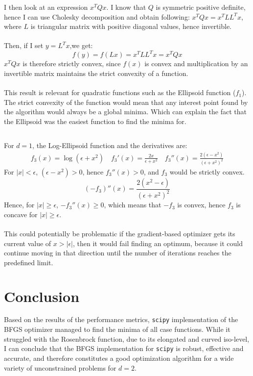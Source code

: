 \documentclass[a4paper]{article}
\begin{document}
I then look at an expression $x^TQx$. I know that $Q$ is symmetric
positive definite, hence I can use Cholesky decomposition and obtain following:
$x^TQx = x^TLL^Tx$, where $L$ is triangular matrix with positive diagonal
values, hence invertible.\\\\
Then, if I set $y=L^Tx$,we get:
\[
f(y) = f(Lx) = x^TLL^Tx = x^TQx
\]
$x^TQx$ is therefore strictly convex, since $f(x)$ is convex and 
multiplication by an invertible matrix maintains the strict convexity of a function. \\\\
This result is relevant for quadratic functions such as the Ellipsoid
function ($f_1$). The strict convexity of the function would mean that any
interest point found by the algorithm would always be a global minima. Which can
explain the fact that the Ellipsoid was the easiest function to find the minima for.


\subsection{}
For $d=1$, the Log-Ellipsoid function and the derivatives are:
\begin{align*}
  f_3(x) = \log(\epsilon + x^2) \quad
  f_3'(x) = \frac{2x}{\epsilon + x^2} \quad
  f_3''(x) = \frac{2(\epsilon - x^2)}{(\epsilon + x^2)^2}
\end{align*}
For $|x| < \epsilon$, $(\epsilon - x^2) > 0$, hence $f_3''(x) > 0$, and $f_3$
would be strictly convex.
\[
(-f_3)''(x) = \frac{2(x^2 - \epsilon)}{(\epsilon + x^2)^2}
\]
Hence, for $|x| \geq \epsilon$, $-f_3''(x) \geq 0$, which means that $-f_3$ is
convex, hence $f_3$ is concave for $|x| \geq \epsilon$.\\\\
This could potentially be problematic if the gradient-based optimizer gets its current value of
$x>|\epsilon|$, then it would fail finding an optimum, because it could continue
moving in that direction until the number of iterations reaches the predefined limit. 

\section{Conclusion}
Based on the results of the performance metrics,
\texttt{scipy} implementation of the BFGS optimizer managed to find the minima
of all case functions. While it struggled with the Rosenbrock function, due to its
elongated and curved iso-level, I can conclude that the BFGS implementation for
\texttt{scipy} is robust, effective and accurate, and therefore constitutes a
good optimization algorithm for a wide variety of unconstrained problems for $d=2$.
\end{document}
